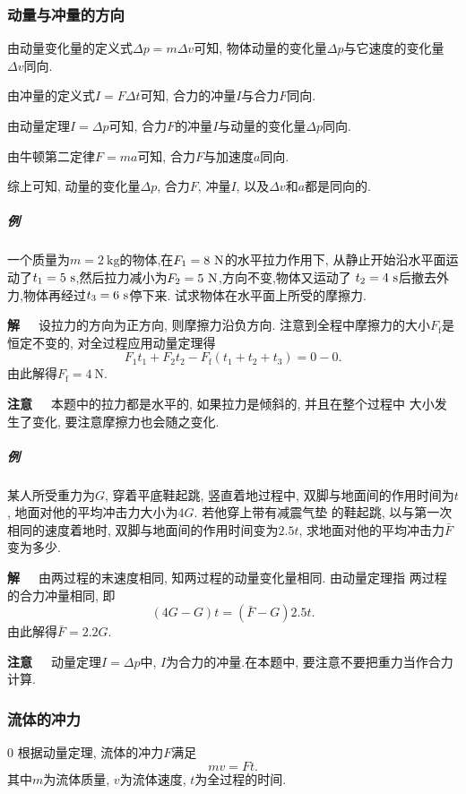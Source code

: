 \documentclass[12pt,a4paper]{ctexart}
\newcounter{exam}[section]
\newcommand{\bre}{\ \ \ }
\begin{document}
\subsubsection{动量与冲量的方向}
由动量变化量的定义式$\Delta p = m\Delta v$可知, 物体动量的变化量$\Delta p$与它速度的变化量$\Delta v$同向.

由冲量的定义式$I = F\Delta t$可知, 合力的冲量$I$与合力$F$同向.

由动量定理$I = \Delta p$可知, 合力$F$的冲量$I$与动量的变化量$\Delta p$同向.

由牛顿第二定律$F = ma$可知, 合力$F$与加速度$a$同向.

综上可知, 动量的变化量$\Delta p$, 合力$F$, 冲量$I$, 以及$\Delta v$和$a$都是同向的.

\setlength{\abovedisplayskip}{3pt}
\setlength{\belowdisplayskip}{3pt}
\subparagraph{例\theexam} 一个质量为$m = 2\ \mathrm{kg}$的物体,在$F_1 = 8\ \rm{N}$的水平拉力作用下,
从静止开始沿水平面运动了$t_1 = 5\ \rm{s}$,然后拉力减小为$F_2=5\ \rm{N}$,方向不变,物体又运动了
$t_2=4\ \rm{s}$后撤去外力,物体再经过$t_3=6\ \rm{s}$停下来. 试求物体在水平面上所受的摩擦力.

\textbf{解}\bre 设拉力的方向为正方向, 则摩擦力沿负方向.
注意到全程中摩擦力的大小$F_\mathrm{f}$是恒定不变的, 对全过程应用动量定理得
$$F_1t_1 + F_2t_2 - F_\mathrm{f}(t_1 + t_2 + t_3) = 0-0.$$
由此解得$F_\mathrm{f} = 4\ \mathrm{N}$.

\textbf{注意}\bre 本题中的拉力都是水平的, 如果拉力是倾斜的, 并且在整个过程中
大小发生了变化, 要注意摩擦力也会随之变化.

\subparagraph{例\theexam}某人所受重力为$G$, 穿着平底鞋起跳, 竖直着地过程中,
双脚与地面间的作用时间为$t$, 地面对他的平均冲击力大小为$4G$. 若他穿上带有减震气垫
的鞋起跳, 以与第一次相同的速度着地时, 双脚与地面间的作用时间变为$2.5t$,
求地面对他的平均冲击力$\bar{F}$变为多少.

\textbf{解}\bre 由两过程的末速度相同, 知两过程的动量变化量相同. 由动量定理指
两过程的合力冲量相同, 即
$$(4G-G)t = (\bar{F} - G)2.5t.$$
由此解得$\bar{F} = 2.2G.$

\textbf{注意}\bre 动量定理$I = \Delta p$中, $I$为合力的冲量.在本题中, 要注意不要把重力当作合力计算.

\subsubsection{流体的冲力}
\setlength{\abovedisplayskip}{3pt}
\setlength{\belowdisplayskip}{3pt}0
根据动量定理, 流体的冲力$F$满足$$mv = Ft.$$
其中$m$为流体质量, $v$为流体速度, $t$为全过程的时间.
\end{document}
